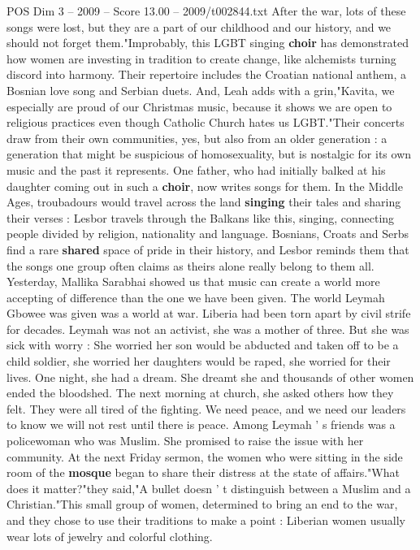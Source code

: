 \begin{textsample}{POS Dim 3 – 2009 – Score 13.00 – 2009/t002844.txt}
After the war, lots of these songs were lost, but they are a part of our childhood and our history, and we should not forget them."Improbably, this LGBT singing \textbf{choir} has demonstrated how women are investing in tradition to create change, like alchemists turning discord into harmony.
Their repertoire includes the Croatian national anthem, a Bosnian love song and Serbian duets.
And, Leah adds with a grin,"Kavita, we especially are proud of our Christmas music, because it shows we are open to religious practices even though Catholic Church hates us LGBT."Their concerts draw from their own communities, yes, but also from an older generation : a generation that might be suspicious of homosexuality, but is nostalgic for its own music and the past it represents.
One father, who had initially balked at his daughter coming out in such a \textbf{choir}, now writes songs for them.
In the Middle Ages, troubadours would travel across the land \textbf{singing} their tales and sharing their verses : Lesbor travels through the Balkans like this, singing, connecting people divided by religion, nationality and language.
Bosnians, Croats and Serbs find a rare \textbf{shared} space of pride in their history, and Lesbor reminds them that the songs one group often claims as theirs alone really belong to them all.
Yesterday, Mallika Sarabhai showed us that music can create a world more accepting of difference than the one we have been given.
The world Leymah Gbowee was given was a world at war.
Liberia had been torn apart by civil strife for decades.
Leymah was not an activist, she was a mother of three.
But she was sick with worry : She worried her son would be abducted and taken off to be a child soldier, she worried her daughters would be raped, she worried for their lives.
One night, she had a dream.
She dreamt she and thousands of other women ended the bloodshed.
The next morning at church, she asked others how they felt.
They were all tired of the fighting.
We need peace, and we need our leaders to know we will not rest until there is peace.
Among Leymah ' s friends was a policewoman who was Muslim.
She promised to raise the issue with her community.
At the next Friday sermon, the women who were sitting in the side room of the \textbf{mosque} began to share their distress at the state of affairs."What does it matter?"they said,"A bullet doesn ' t distinguish between a Muslim and a Christian."This small group of women, determined to bring an end to the war, and they chose to use their traditions to make a point : Liberian women usually wear lots of jewelry and colorful clothing.

\end{textsample}
